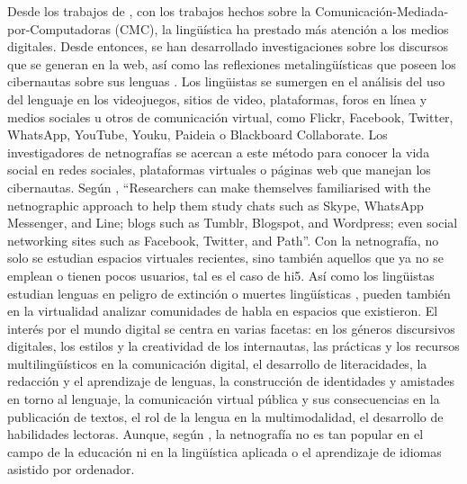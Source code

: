 Desde los trabajos de \textcite{herring_2004}, con los trabajos hechos sobre la
Comunicación-Mediada-por-Computadoras (CMC), la lingüística ha prestado
más atención a los medios digitales. Desde entonces, se han desarrollado
investigaciones sobre los discursos que se generan en la web, así como
las reflexiones metalingüísticas que poseen los cibernautas sobre sus
lenguas \cite{tannen2013}. Los lingüistas se sumergen en el
análisis del uso del lenguaje en los videojuegos, sitios de video,
plataformas, foros en línea \cite{lovón-lóvon2022} y medios sociales u
otros de comunicación virtual, como Flickr, Facebook, Twitter, WhatsApp,
YouTube, Youku, Paideia o Blackboard Collaborate. Los investigadores de
netnografías se acercan a este método para conocer la vida social en
redes sociales, plataformas virtuales o páginas web que manejan los
cibernautas. Según \textcite{putrikusama2016}, ``Researchers can make
themselves familiarised with the netnographic approach to help them
study chats such as Skype, WhatsApp Messenger, and Line; blogs such as
Tumblr, Blogspot, and Wordpress; even social networking sites such as
Facebook, Twitter, and Path''. Con la netnografía, no solo se estudian
espacios virtuales recientes, sino también aquellos que ya no se emplean
o tienen pocos usuarios, tal es el caso de hi5. Así como los lingüistas
estudian lenguas en peligro de extinción o muertes lingüísticas
\cite{ramirez-cruz2021}, pueden también en la virtualidad
analizar comunidades de habla en espacios que existieron. El interés por
el mundo digital se centra en varias facetas: en los géneros discursivos
digitales, los estilos y la creatividad de los internautas, las
prácticas y los recursos multilingüísticos en la comunicación digital,
el desarrollo de literacidades, la redacción y el aprendizaje de
lenguas, la construcción de identidades y amistades en torno al
lenguaje, la comunicación virtual pública y sus consecuencias en la
publicación de textos, el rol de la lengua en la multimodalidad, el
desarrollo de habilidades lectoras\cite{georgakopoulou2016}.
Aunque, según \cite{kulavuz-onal2015}, la netnografía no es tan popular en
el campo de la educación ni en la lingüística aplicada o el aprendizaje
de idiomas asistido por ordenador.

